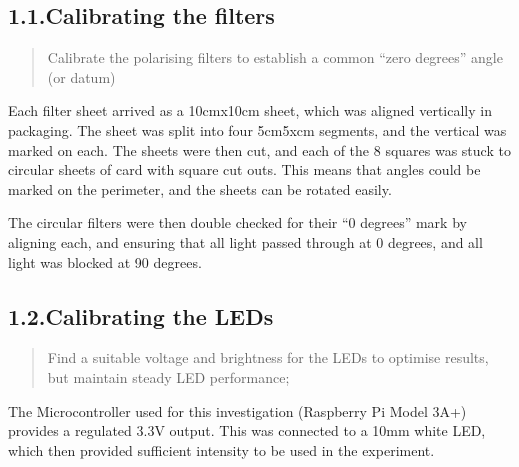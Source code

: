\documentclass{article}
\begin{document}
\subsection{1.1.\hspace*{0.5em}Calibrating the filters}\label{sec-calibrating-the-filters}%

\begin{quote}%

\noindent{}Calibrate the polarising filters to establish a common \textquotedblleft{}zero degrees\textquotedblright{} angle (or datum)%
\end{quote}%

\noindent{}Each filter sheet arrived as a 10cmx10cm sheet, which was aligned vertically in packaging. The sheet was split into four 5cm5xcm segments, and the vertical was marked on each. The sheets were then cut, and each of the 8 squares was stuck to circular sheets of card with square cut outs. This means that angles could be marked on the perimeter, and the sheets can be rotated easily.%

The circular filters were then double checked for their \textquotedblleft{}0 degrees\textquotedblright{} mark by aligning each, and ensuring that all light passed through at 0 degrees, and all light was blocked at 90 degrees.%

\subsection{1.2.\hspace*{0.5em}Calibrating the LEDs}\label{sec-calibrating-the-leds}%

\begin{quote}%

\noindent{}Find a suitable voltage and brightness for the LEDs to optimise results, but maintain steady LED performance;%
\end{quote}%

\noindent{}The Microcontroller used for this investigation (Raspberry Pi Model 3A+) provides a regulated 3.3V output. This was connected to a 10mm white LED, which then provided sufficient intensity to be used in the experiment.%
\end{document}
